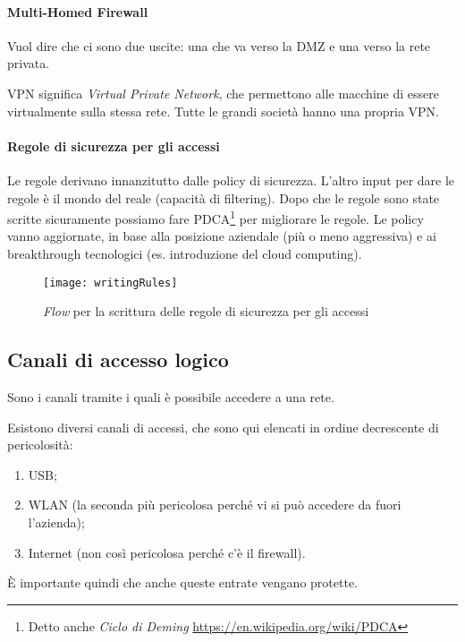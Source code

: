 \paragraph*{Multi-Homed Firewall}

Vuol dire che ci sono due uscite: una che va verso la DMZ e una verso la rete
privata.

VPN significa \textit{Virtual Private Network}, che permettono alle macchine di
essere virtualmente sulla stessa rete. Tutte le grandi società hanno una propria
VPN.

\paragraph*{Regole di sicurezza per gli accessi}

Le regole derivano innanzitutto dalle policy di sicurezza. L'altro input per
dare le regole è il mondo del reale (capacità di filtering). Dopo che le regole
sono state scritte sicuramente possiamo fare PDCA\footnote{Detto anche
\textit{Ciclo di Deming} \url{https://en.wikipedia.org/wiki/PDCA}} per
migliorare le regole. Le policy vanno aggiornate,
in base alla posizione aziendale (più o meno aggressiva) e ai breakthrough
tecnologici (es. introduzione del cloud computing).

\begin{figure}[H]
 \centering
 \texttt{[image: writingRules]}
 \caption{\textit{Flow} per la scrittura delle regole di sicurezza per gli
accessi}
\end{figure}

\subsection{Canali di accesso logico}

Sono i canali tramite i quali è possibile accedere a una rete.

Esistono diversi canali di accessi, che sono qui elencati in ordine
decrescente di pericolosità:
\begin{enumerate}
 \item USB;
 \item WLAN (la seconda più pericolosa perché vi si può accedere da fuori
l'azienda);
 \item Internet (non così pericolosa perché c'è il firewall).
\end{enumerate}

È importante quindi che anche queste entrate vengano protette.

